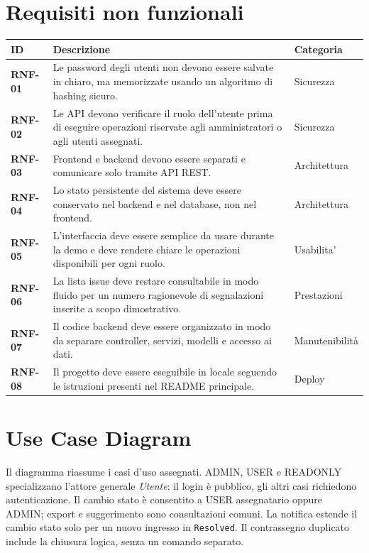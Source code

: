 \documentclass[12pt,a4paper]{article}
\begin{document}
\clearpage
\section{Requisiti non funzionali}

\begin{longtable}{>{\bfseries}p{} p{} p{}}
\toprule
ID & Descrizione & Categoria \\
\midrule
RNF-01 & Le password degli utenti non devono essere salvate in chiaro, ma memorizzate usando un algoritmo di hashing sicuro. & Sicurezza \\
RNF-02 & Le API devono verificare il ruolo dell'utente prima di eseguire operazioni riservate agli amministratori o agli utenti assegnati. & Sicurezza \\
RNF-03 & Frontend e backend devono essere separati e comunicare solo tramite API REST. & Architettura \\
RNF-04 & Lo stato persistente del sistema deve essere conservato nel backend e nel database, non nel frontend. & Architettura \\
RNF-05 & L'interfaccia deve essere semplice da usare durante la demo e deve rendere chiare le operazioni disponibili per ogni ruolo. & Usabilita' \\
RNF-06 & La lista issue deve restare consultabile in modo fluido per un numero ragionevole di segnalazioni inserite a scopo dimostrativo. & Prestazioni \\
RNF-07 & Il codice backend deve essere organizzato in modo da separare controller, servizi, modelli e accesso ai dati. & Manutenibilità \\
RNF-08 & Il progetto deve essere eseguibile in locale seguendo le istruzioni presenti nel README principale. & Deploy \\
\bottomrule
\end{longtable}

\clearpage
\section{Use Case Diagram}

Il diagramma riassume i casi d'uso assegnati. ADMIN, USER e READONLY specializzano l'attore generale \textit{Utente}: il login è pubblico, gli altri casi richiedono autenticazione. Il cambio stato è consentito a USER assegnatario oppure ADMIN; export e suggerimento sono consultazioni comuni. La notifica estende il cambio stato solo per un nuovo ingresso in \texttt{Resolved}. Il contrassegno duplicato include la chiusura logica, senza un comando separato.
\end{document}
